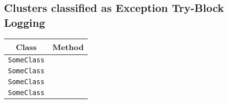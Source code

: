 \subsection{Clusters classified as Exception Try-Block Logging}

\begin{center}
\begin{tabular}{ll}\toprule
\multicolumn{1}{c}{Class}&\multicolumn{1}{c}{Method}\\\midrule
\lstinline/SomeClass/&\raisebox{0pt}{\lstinline/foo(int)/}\\
\lstinline/SomeClass/&\raisebox{0pt}{\lstinline/foo(int)/}\\
\lstinline/SomeClass/&\raisebox{0pt}{\lstinline/foo(int)/}\\
\lstinline/SomeClass/&\raisebox{0pt}{\lstinline/foo(int)/}\\
\bottomrule
\end{tabular}
\end{center}

